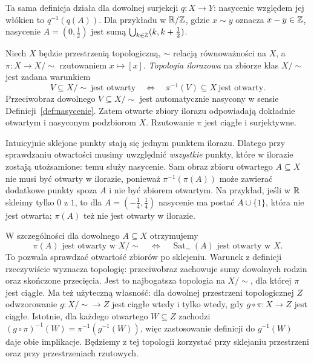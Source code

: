 Ta sama definicja działa dla dowolnej surjekcji
$q\colon X\to Y$: nasycenie względem jej włókien to
$q^{-1}(q(A))$. Dla przykładu w $\mathbb{R}/{\mathbb{Z}}$, gdzie
$x\sim y$ oznacza $x-y\in\mathbb{Z}$, nasycenie
$A=(0,\tfrac12)$ jest sumą
$\bigcup_{k\in\mathbb{Z}}(k,k+\tfrac12)$.

\begin{definicja}\label{def:topologia-ilorazowa}
Niech $X$ będzie przestrzenią topologiczną, $\sim$ relacją równoważności
na $X$, a $\pi\colon X\to X/{\sim}$ rzutowaniem
$x\mapsto[x]$. \emph{Topologia ilorazowa} na zbiorze klas $X/{\sim}$
jest zadana warunkiem
\[
 V\subseteq X/{\sim}\ \text{jest otwarty}
 \quad\Longleftrightarrow\quad
 \pi^{-1}(V)\subseteq X\ \text{jest otwarty}.
\]
Przeciwobraz dowolnego $V\subseteq X/{\sim}$ jest
automatycznie nasycony w sensie
Definicji~\ref{def:nasycenie}. Zatem otwarte zbiory
ilorazu odpowiadają dokładnie otwartym
i nasyconym podzbiorom $X$.
Rzutowanie $\pi$ jest ciągłe i surjektywne.
\end{definicja}

Intuicyjnie sklejone punkty stają się jednym punktem ilorazu.
Dlatego przy sprawdzaniu otwartości musimy uwzględnić
\emph{wszystkie} punkty, które w ilorazie zostają utożsamione:
temu służy nasycenie. Sam obraz zbioru otwartego
$A\subseteq X$ nie musi być otwarty w ilorazie,
ponieważ $\pi^{-1}(\pi(A))$ może zawierać dodatkowe
punkty spoza $A$ i nie być zbiorem otwartym.
Na przykład, jeśli w $\mathbb{R}$ skleimy tylko $0$ z $1$,
to dla $A=(-\tfrac14,\tfrac14)$ nasycenie ma postać
$A\cup\{1\}$, która nie jest otwarta; $\pi(A)$ też
nie jest otwarty w ilorazie.

W szczególności dla dowolnego $A\subseteq X$ otrzymujemy
\[
 \pi(A)\text{ jest otwarty w }X/{\sim}
 \quad\Longleftrightarrow\quad
 \operatorname{Sat}_{\sim}(A)\text{ jest otwarty w }X.
\]
To pozwala sprawdzać otwartość zbiorów po sklejeniu.
Warunek z definicji rzeczywiście wyznacza topologię: przeciwobraz
zachowuje sumy dowolnych rodzin oraz skończone przecięcia.
Jest to najbogatsza topologia na $X/{\sim}$, dla której $\pi$ jest
ciągłe. Ma też użyteczną własność: dla dowolnej przestrzeni
topologicznej $Z$ odwzorowanie $g\colon X/{\sim}\to Z$ jest ciągłe
wtedy i tylko wtedy, gdy $g\circ\pi\colon X\to Z$ jest ciągłe.
Istotnie, dla każdego otwartego $W\subseteq Z$ zachodzi
$(g\circ\pi)^{-1}(W)=\pi^{-1}(g^{-1}(W))$, więc zastosowanie definicji
do $g^{-1}(W)$ daje obie implikacje. Będziemy z tej topologii
korzystać przy sklejaniu przestrzeni oraz przy przestrzeniach
rzutowych.

